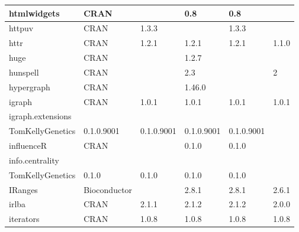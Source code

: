 \begin{longtable}{|llllll|}
htmlwidgets                   & CRAN                      &             & 0.8         & 0.8            &                  \\ \hline
httpuv                        & CRAN                      & 1.3.3       &             & 1.3.3          &                   \\ \hline \rowcolor{gray!25}
httr                          & CRAN                      & 1.2.1       & 1.2.1       & 1.2.1          & 1.1.0            \\ \hline
huge                          & CRAN                      &             & 1.2.7       &                &                   \\ \hline \rowcolor{gray!25}
hunspell                      & CRAN                      &             & 2.3         &                & 2                \\ \hline
hypergraph                    & CRAN                      &             & 1.46.0      &                &                   \\ \hline \rowcolor{gray!25}
igraph                        & CRAN                      & 1.0.1       & 1.0.1       & 1.0.1          & 1.0.1            \\ \hline
igraph.extensions             & \begin{tabular}[c]{@{}l@{}}GitHub \\ TomKellyGenetics \end{tabular}  & 0.1.0.9001  & 0.1.0.9001  & 0.1.0.9001     & 0.1.0.9001        \\ \hline \rowcolor{gray!25}
influenceR                    & CRAN                      &             & 0.1.0       & 0.1.0          &                  \\ \hline
info.centrality               & \begin{tabular}[c]{@{}l@{}}GitHub \\ TomKellyGenetics \end{tabular}  & 0.1.0       & 0.1.0       & 0.1.0          & 0.1.0             \\ \hline \rowcolor{gray!25}
IRanges                       & Bioconductor              &             & 2.8.1       & 2.8.1          & 2.6.1            \\ \hline
irlba                         & CRAN                      & 2.1.1       & 2.1.2       & 2.1.2          & 2.0.0             \\ \hline \rowcolor{gray!25}
iterators                     & CRAN                      & 1.0.8       & 1.0.8       & 1.0.8          & 1.0.8            \\ \hline

\end{longtable}
